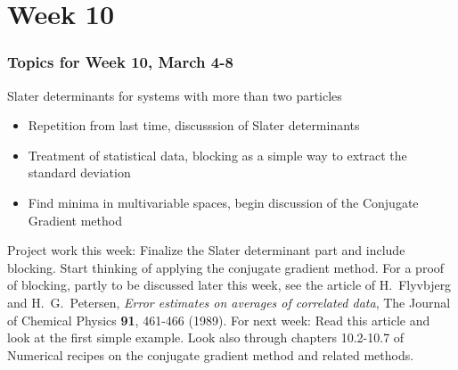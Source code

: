 \documentclass[compress]{beamer}
\begin{document}
\section[Week 10]{Week 10}
\frame
{
  \frametitle{Topics for Week 10, March 4-8}
  \begin{block}{Slater determinants for systems with more than two particles}
\begin{itemize}
\item Repetition from last time, discusssion of Slater determinants
\item Treatment of statistical data, blocking as a simple way to extract the standard deviation
\item Find minima in multivariable spaces, begin discussion of the Conjugate Gradient method
\end{itemize}
Project work this week: Finalize the Slater determinant part and include blocking. Start thinking of applying the conjugate gradient method. For a proof of blocking, partly to be discussed later this week, see the article of 
H.~Flyvbjerg and H.~G.~Petersen, {\em Error estimates on averages of correlated data},  The Journal of Chemical Physics {\bf 91}, 461-466 (1989).
For next week: Read this article and look at the first simple example. Look  also through chapters 10.2-10.7 of Numerical recipes on the conjugate gradient method and related methods.
  \end{block}
} 

\end{document}
